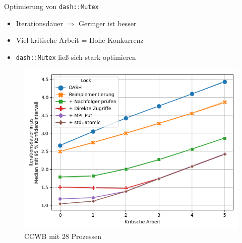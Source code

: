 \documentclass[fleqn,compress,utf8,aspectratio=169,t]{beamer}
\begin{document}
\begin{frame}{Optimierung von \texttt{dash::Mutex}}
    \begin{minipage}{.52\textwidth}
        \begin{itemize}
            \setlength\itemsep{.75em}
            \item Iterationsdauer $\Rightarrow$ Geringer ist besser
            \item Viel kritische Arbeit = Hohe Konkurrenz
            \item \texttt{dash::Mutex} ließ sich stark optimieren
        \end{itemize}
    \end{minipage}
    \begin{minipage}{.47\textwidth}
        \begin{figure}
            \includegraphics[width=\textwidth]{../../Dokumentation/Latex/Bilder/benchmarks/intelmpi/dash-optimization/CCWB-processes=28-latency}
            \caption{CCWB mit 28 Prozessen}
        \end{figure}
    \end{minipage}
\end{frame}
\end{document}
